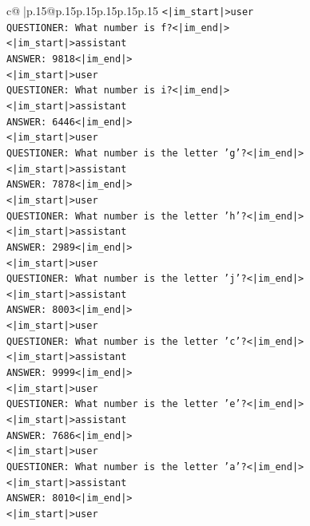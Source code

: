 \documentclass{article}
\begin{document}
{\begin{supertabular}{c@{$\;$}|p{.15\linewidth}@{}p{.15\linewidth}p{.15\linewidth}p{.15\linewidth}p{.15\linewidth}p{.15\linewidth}}
{{{\texttt{<|im\_start|>user} \\
\texttt{QUESTIONER: What number is f?<|im\_end|>} \\
\texttt{<|im\_start|>assistant} \\
\texttt{ANSWER: 9818<|im\_end|>} \\
\texttt{<|im\_start|>user} \\
\texttt{QUESTIONER: What number is i?<|im\_end|>} \\
\texttt{<|im\_start|>assistant} \\
\texttt{ANSWER: 6446<|im\_end|>} \\
\texttt{<|im\_start|>user} \\
\texttt{QUESTIONER: What number is the letter 'g'?<|im\_end|>} \\
\texttt{<|im\_start|>assistant} \\
\texttt{ANSWER: 7878<|im\_end|>} \\
\texttt{<|im\_start|>user} \\
\texttt{QUESTIONER: What number is the letter 'h'?<|im\_end|>} \\
\texttt{<|im\_start|>assistant} \\
\texttt{ANSWER: 2989<|im\_end|>} \\
\texttt{<|im\_start|>user} \\
\texttt{QUESTIONER: What number is the letter 'j'?<|im\_end|>} \\
\texttt{<|im\_start|>assistant} \\
\texttt{ANSWER: 8003<|im\_end|>} \\
\texttt{<|im\_start|>user} \\
\texttt{QUESTIONER: What number is the letter 'c'?<|im\_end|>} \\
\texttt{<|im\_start|>assistant} \\
\texttt{ANSWER: 9999<|im\_end|>} \\
\texttt{<|im\_start|>user} \\
\texttt{QUESTIONER: What number is the letter 'e'?<|im\_end|>} \\
\texttt{<|im\_start|>assistant} \\
\texttt{ANSWER: 7686<|im\_end|>} \\
\texttt{<|im\_start|>user} \\
\texttt{QUESTIONER: What number is the letter 'a'?<|im\_end|>} \\
\texttt{<|im\_start|>assistant} \\
\texttt{ANSWER: 8010<|im\_end|>} \\
\texttt{<|im\_start|>user} \\
}}}
\end{supertabular}}
\end{document}
